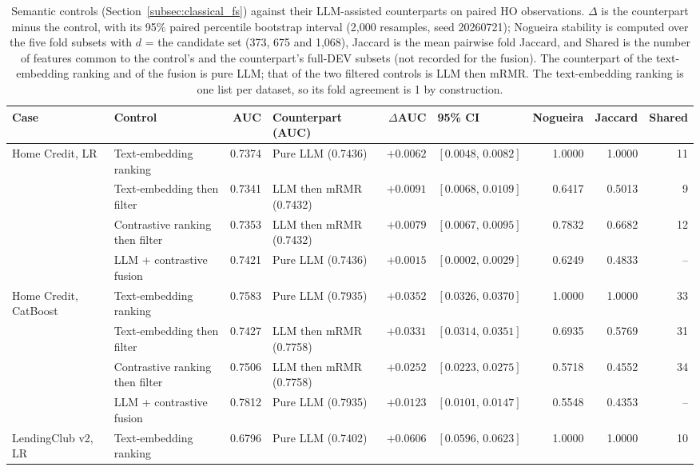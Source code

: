 \documentclass[final,5p,twocolumn]{elsarticle}
\begin{document}
\begin{table}[htbp]
\centering
\scriptsize
\setlength{\tabcolsep}{2pt}
\begin{threeparttable}
\caption{Semantic controls (Section~\ref{subsec:classical_fs}) against their LLM-assisted counterparts on paired HO observations. $\Delta$ is the counterpart minus the control, with its 95\% paired percentile bootstrap interval (2,000 resamples, seed 20260721); Nogueira stability is computed over the five fold subsets with $d$ = the candidate set (373, 675 and 1,068), Jaccard is the mean pairwise fold Jaccard, and Shared is the number of features common to the control's and the counterpart's full-DEV subsets (not recorded for the fusion). The counterpart of the text-embedding ranking and of the fusion is pure LLM; that of the two filtered controls is LLM then mRMR. The text-embedding ranking is one list per dataset, so its fold agreement is 1 by construction.}
\label{tab:semantic_controls}
\begin{tabular}{@{}llrlrlrrr@{}}
\toprule
Case & Control & AUC & Counterpart (AUC) & $\Delta$AUC & 95\% CI & Nogueira & Jaccard & Shared \\
\midrule
Home Credit, LR & Text-embedding ranking & 0.7374 & Pure LLM (0.7436) & $+0.0062$ & $[0.0048,\,0.0082]$ & 1.0000 & 1.0000 & 11 \\
 & Text-embedding then filter & 0.7341 & LLM then mRMR (0.7432) & $+0.0091$ & $[0.0068,\,0.0109]$ & 0.6417 & 0.5013 & 9 \\
 & Contrastive ranking then filter & 0.7353 & LLM then mRMR (0.7432) & $+0.0079$ & $[0.0067,\,0.0095]$ & 0.7832 & 0.6682 & 12 \\
 & LLM + contrastive fusion & 0.7421 & Pure LLM (0.7436) & $+0.0015$ & $[0.0002,\,0.0029]$ & 0.6249 & 0.4833 & -- \\
\addlinespace
Home Credit, CatBoost & Text-embedding ranking & 0.7583 & Pure LLM (0.7935) & $+0.0352$ & $[0.0326,\,0.0370]$ & 1.0000 & 1.0000 & 33 \\
 & Text-embedding then filter & 0.7427 & LLM then mRMR (0.7758) & $+0.0331$ & $[0.0314,\,0.0351]$ & 0.6935 & 0.5769 & 31 \\
 & Contrastive ranking then filter & 0.7506 & LLM then mRMR (0.7758) & $+0.0252$ & $[0.0223,\,0.0275]$ & 0.5718 & 0.4552 & 34 \\
 & LLM + contrastive fusion & 0.7812 & Pure LLM (0.7935) & $+0.0123$ & $[0.0101,\,0.0147]$ & 0.5548 & 0.4353 & -- \\
\addlinespace
LendingClub v2, LR & Text-embedding ranking & 0.6796 & Pure LLM (0.7402) & $+0.0606$ & $[0.0596,\,0.0623]$ & 1.0000 & 1.0000 & 10 \\

\end{tabular}
\end{threeparttable}
\end{table}
\end{document}
